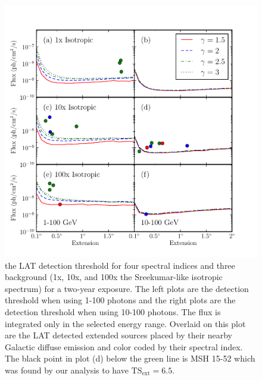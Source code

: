 \documentclass[12pt,preprint]{aastex}
\newcommand{\gev}{\text{GeV}\xspace}
\newcommand{\tsext}{{\ensuremath{\text{TS}_{\text{ext}}}}\xspace}
\begin{document}
\clearpage
\begin{figure}
  \begin{center}
    \includegraphics{mc_plots/all_sensitivity.pdf}
    \end{center}
    \caption{the LAT detection threshold for four spectral indices and
    three background (1x, 10x, and 100x the Sreekumar-like isotropic
    spectrum) for a two-year exposure. The left plots are the detection
    threshold when using 1-100 \gev photons and the right plots are
    the detection threshold when using 10-100 \gev photons.  The flux
    is integrated only in the selected energy range.  Overlaid on this
    plot are the LAT detected extended sources placed by their nearby
    Galactic diffuse emission and color coded by their spectral index.
    The black point in plot (d) below the green line is MSH 15-52 which
    was found by our analysis to have $\tsext=6.5$.  
    }\label{all_sensitivity} 
  \end{figure}
\end{document}
